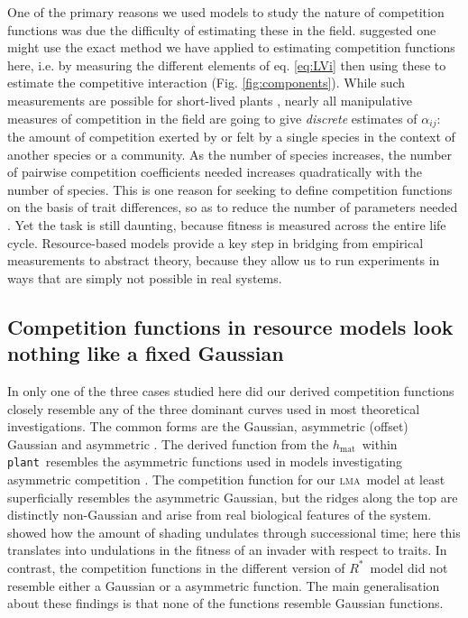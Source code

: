 \documentclass[a4paper,11pt]{article}
\newcommand{\Rstar}{\ensuremath{R^*}}
\newcommand{\plant}{{\tt plant}}
\newcommand{\hmat}{\ensuremath{h_{\text{mat}}}}
\newcommand{\lma}{\textsc{lma}}
\begin{document}
One of the primary reasons we used models to study the nature of competition functions was due the difficulty of estimating these in the field. \citet{Ricklefs-1973} suggested one might use the exact method we have applied to estimating competition functions here, i.e. by measuring the different elements of eq. \ref{eq:LVi} then using these to estimate the competitive interaction (Fig. \ref{fig:components}).
While such measurements are possible for short-lived plants \citep{Kraft-2015}, nearly all manipulative measures of competition in the field are going to give \emph{discrete} estimates of $\alpha_{ij}$: the amount of competition exerted by or felt by a single species in the context of another species or a community. As the number of species increases, the number of pairwise competition coefficients needed increases quadratically with the number of species. This is one reason for seeking to define competition functions on the basis of trait differences, so as to reduce the number of parameters needed \citep{Kraft-2015}. 
Yet the task is still daunting, because fitness is measured across the entire life cycle.
Resource-based models provide a key step in bridging from empirical measurements to abstract theory, because they allow us to run experiments in ways that are simply not possible in real systems.

\subsection{Competition functions in resource models look nothing like a fixed Gaussian}

In only one of the three cases studied here did our derived competition functions closely resemble any of the three dominant curves used in most theoretical investigations. The common forms are the Gaussian, asymmetric (offset) Gaussian \citep{Roughgarden-1979}
and asymmetric \citep[e.g.][]{Kisdi-1999, Law-1997}.
The derived function from the \hmat\ within \plant\
resembles the asymmetric functions used in models investigating asymmetric competition \citep{Law-1997, Geritz-1999, Kisdi-1999,
  Calcagno-2006}. The competition function for our \lma\ model at least superficially resembles the asymmetric Gaussian, but the ridges along the top are distinctly non-Gaussian and arise from real biological features of the system. \citet{Falster-2011} showed how the amount of shading undulates through successional time; here this translates into undulations in the fitness of an invader with respect to traits. In contrast, the competition functions in the different version of \Rstar\ model did not resemble either a Gaussian or a asymmetric function. The main generalisation about these findings is that none of the functions resemble Gaussian functions.
\end{document}
